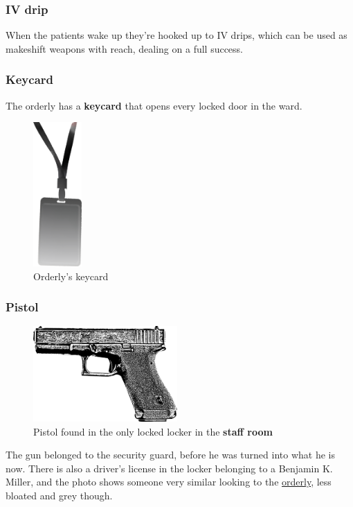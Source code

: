\documentclass[bg-full]{resources/stylesheets/kult}
\begin{document}
\subsubsection{IV drip}%
\label{ssub:iv_drip}

When the patients wake up they're hooked up to IV drips, which can be used as makeshift weapons with reach, dealing 
on a full success.

\subsubsection{Keycard}%
\label{ssub:keycard}

The orderly has a \textbf{keycard} that opens every locked door in the ward.
\begin{figure}[!htbp]
  \includegraphics[height=5.5cm, keepaspectratio]{resources/img/keycard.png}
  \caption{Orderly's keycard}\label{keycard}
\end{figure}

\subsubsection{Pistol}%
\label{ssub:pistol}

\begin{figure}[!htbp]
  \includegraphics[width=5.5cm, keepaspectratio]{resources/img/glock.png}
  \caption{Pistol found in the only locked locker in the \textbf{staff room}}\label{pistol}
\end{figure}
The gun belonged to the security guard, before he was turned into what he is now.  There is also a driver's license in the
locker belonging to a Benjamin K. Miller, and the photo shows someone very similar looking to the
\hyperref[ssub:orderly]{orderly}, less bloated and grey though.
\end{document}
